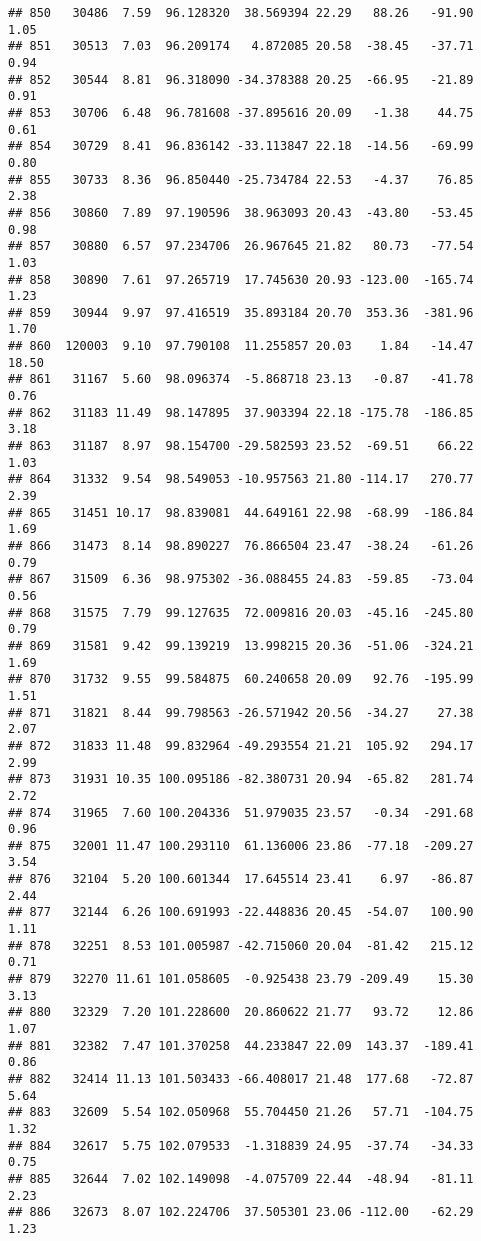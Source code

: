 \documentclass[]{article}
\begin{document}
\begin{verbatim}
## 850   30486  7.59  96.128320  38.569394 22.29   88.26   -91.90  1.05
## 851   30513  7.03  96.209174   4.872085 20.58  -38.45   -37.71  0.94
## 852   30544  8.81  96.318090 -34.378388 20.25  -66.95   -21.89  0.91
## 853   30706  6.48  96.781608 -37.895616 20.09   -1.38    44.75  0.61
## 854   30729  8.41  96.836142 -33.113847 22.18  -14.56   -69.99  0.80
## 855   30733  8.36  96.850440 -25.734784 22.53   -4.37    76.85  2.38
## 856   30860  7.89  97.190596  38.963093 20.43  -43.80   -53.45  0.98
## 857   30880  6.57  97.234706  26.967645 21.82   80.73   -77.54  1.03
## 858   30890  7.61  97.265719  17.745630 20.93 -123.00  -165.74  1.23
## 859   30944  9.97  97.416519  35.893184 20.70  353.36  -381.96  1.70
## 860  120003  9.10  97.790108  11.255857 20.03    1.84   -14.47 18.50
## 861   31167  5.60  98.096374  -5.868718 23.13   -0.87   -41.78  0.76
## 862   31183 11.49  98.147895  37.903394 22.18 -175.78  -186.85  3.18
## 863   31187  8.97  98.154700 -29.582593 23.52  -69.51    66.22  1.03
## 864   31332  9.54  98.549053 -10.957563 21.80 -114.17   270.77  2.39
## 865   31451 10.17  98.839081  44.649161 22.98  -68.99  -186.84  1.69
## 866   31473  8.14  98.890227  76.866504 23.47  -38.24   -61.26  0.79
## 867   31509  6.36  98.975302 -36.088455 24.83  -59.85   -73.04  0.56
## 868   31575  7.79  99.127635  72.009816 20.03  -45.16  -245.80  0.79
## 869   31581  9.42  99.139219  13.998215 20.36  -51.06  -324.21  1.69
## 870   31732  9.55  99.584875  60.240658 20.09   92.76  -195.99  1.51
## 871   31821  8.44  99.798563 -26.571942 20.56  -34.27    27.38  2.07
## 872   31833 11.48  99.832964 -49.293554 21.21  105.92   294.17  2.99
## 873   31931 10.35 100.095186 -82.380731 20.94  -65.82   281.74  2.72
## 874   31965  7.60 100.204336  51.979035 23.57   -0.34  -291.68  0.96
## 875   32001 11.47 100.293110  61.136006 23.86  -77.18  -209.27  3.54
## 876   32104  5.20 100.601344  17.645514 23.41    6.97   -86.87  2.44
## 877   32144  6.26 100.691993 -22.448836 20.45  -54.07   100.90  1.11
## 878   32251  8.53 101.005987 -42.715060 20.04  -81.42   215.12  0.71
## 879   32270 11.61 101.058605  -0.925438 23.79 -209.49    15.30  3.13
## 880   32329  7.20 101.228600  20.860622 21.77   93.72    12.86  1.07
## 881   32382  7.47 101.370258  44.233847 22.09  143.37  -189.41  0.86
## 882   32414 11.13 101.503433 -66.408017 21.48  177.68   -72.87  5.64
## 883   32609  5.54 102.050968  55.704450 21.26   57.71  -104.75  1.32
## 884   32617  5.75 102.079533  -1.318839 24.95  -37.74   -34.33  0.75
## 885   32644  7.02 102.149098  -4.075709 22.44  -48.94   -81.11  2.23
## 886   32673  8.07 102.224706  37.505301 23.06 -112.00   -62.29  1.23

\end{verbatim}
\end{document}
